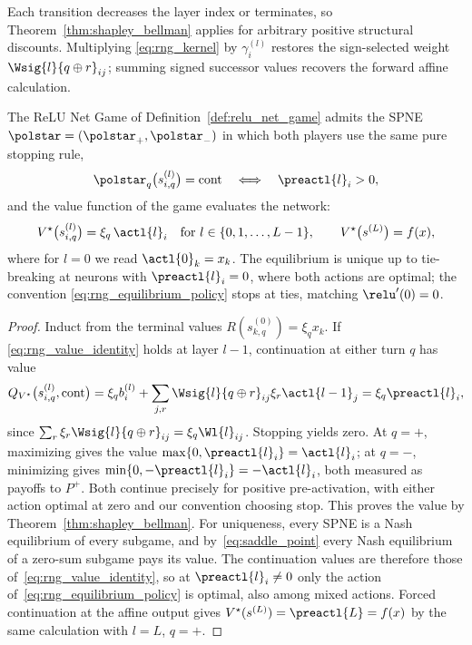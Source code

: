 Each transition decreases the layer index or terminates, so Theorem~\ref{thm:shapley_bellman} applies for arbitrary positive structural discounts. Multiplying \eqref{eq:rng_kernel} by $\gamma^{(l)}_i$ restores the sign-selected weight $\Wsig{l}{q\oplus r}_{ij}$; summing signed successor values recovers the forward affine calculation.

\begin{theoremenv}\label{thm:relu_net_game_value}
The ReLU Net Game of Definition~\ref{def:relu_net_game} admits the SPNE $\polstar = (\polstar_{+}, \polstar_{-})$ in which both players use the same pure stopping rule,
\begin{equation}
	\polstar_{q}\bigl( s^{(l)}_{i,q} \bigr) = \mathrm{cont}
	\quad \Longleftrightarrow \quad
	\preactl{l}_i > 0,
	\label{eq:rng_equilibrium_policy}
\end{equation}
and the value function of the game evaluates the network:
\begin{equation}
	V^{\star}\bigl(s^{(l)}_{i,q}\bigr) = \xi_{q}\, \actl{l}_i
	\quad \text{for } l \in \{0, 1, \ldots, L-1\},
	\qquad
	V^{\star}\bigl(s^{(L)}\bigr) = f(x),
	\label{eq:rng_value_identity}
\end{equation}
where for $l = 0$ we read $\actl{0}_k = x_k$. The equilibrium is unique up to tie-breaking at neurons with $\preactl{l}_i = 0$, where both actions are optimal; the convention \eqref{eq:rng_equilibrium_policy} stops at ties, matching $\relu'(0) = 0$.\end{theoremenv}

\begin{proof}
Induct from the terminal values $R(s^{(0)}_{k,q})=\xi_qx_k$. If \eqref{eq:rng_value_identity} holds at layer $l-1$, continuation at either turn $q$ has value
\begin{equation}
Q_{V^{\star}}\bigl(s^{(l)}_{i,q},\mathrm{cont}\bigr)
=\xi_q b^{(l)}_i+\sum_{j,r}\Wsig{l}{q\oplus r}_{ij}\xi_r\actl{l-1}_j
=\xi_q\preactl{l}_i,
\label{eq:rng_cont_value}
\end{equation}
since $\sum_r\xi_r\Wsig{l}{q\oplus r}_{ij}=\xi_q\Wl{l}_{ij}$. Stopping yields zero. At $q=+$, maximizing gives the value $\max\{0,\preactl{l}_i\}=\actl{l}_i$; at $q=-$, minimizing gives $\min\{0,-\preactl{l}_i\}=-\actl{l}_i$, both measured as payoffs to $P^+$. Both continue precisely for positive pre-activation, with either action optimal at zero and our convention choosing stop. This proves the value by Theorem~\ref{thm:shapley_bellman}. For uniqueness, every SPNE is a Nash equilibrium of every subgame, and by~\eqref{eq:saddle_point} every Nash equilibrium of a zero-sum subgame pays its value. The continuation values are therefore those of~\eqref{eq:rng_value_identity}, so at $\preactl{l}_i\neq0$ only the action of~\eqref{eq:rng_equilibrium_policy} is optimal, also among mixed actions. Forced continuation at the affine output gives $V^{\star}(s^{(L)})=\preactl{L}=f(x)$ by the same calculation with $l=L$, $q=+$.
\end{proof}

